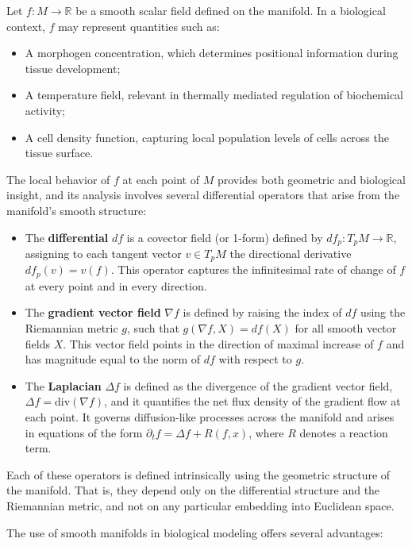 Let $f : M \to \mathbb{R}$ be a smooth scalar field defined on the manifold. In a biological context, $f$ may represent quantities such as:

\begin{itemize}
\item A morphogen concentration, which determines positional information during tissue development;
\item A temperature field, relevant in thermally mediated regulation of biochemical activity;
\item A cell density function, capturing local population levels of cells across the tissue surface.
\end{itemize}

The local behavior of $f$ at each point of $M$ provides both geometric and biological insight, and its analysis involves several differential operators that arise from the manifold's smooth structure:

\begin{itemize}
\item The \textbf{differential} $df$ is a covector field (or 1-form) defined by $df_p : T_p M \to \mathbb{R}$, assigning to each tangent vector $v \in T_p M$ the directional derivative $df_p(v) = v(f)$. This operator captures the infinitesimal rate of change of $f$ at every point and in every direction.
\item The \textbf{gradient vector field} $\nabla f$ is defined by raising the index of $df$ using the Riemannian metric $g$, such that $g(\nabla f, X) = df(X)$ for all smooth vector fields $X$. This vector field points in the direction of maximal increase of $f$ and has magnitude equal to the norm of $df$ with respect to $g$.
\item The \textbf{Laplacian} $\Delta f$ is defined as the divergence of the gradient vector field, $\Delta f = \text{div}(\nabla f)$, and it quantifies the net flux density of the gradient flow at each point. It governs diffusion-like processes across the manifold and arises in equations of the form $\partial_t f = \Delta f + R(f, x)$, where $R$ denotes a reaction term.
\end{itemize}

Each of these operators is defined intrinsically using the geometric structure of the manifold. That is, they depend only on the differential structure and the Riemannian metric, and not on any particular embedding into Euclidean space.

The use of smooth manifolds in biological modeling offers several advantages:

